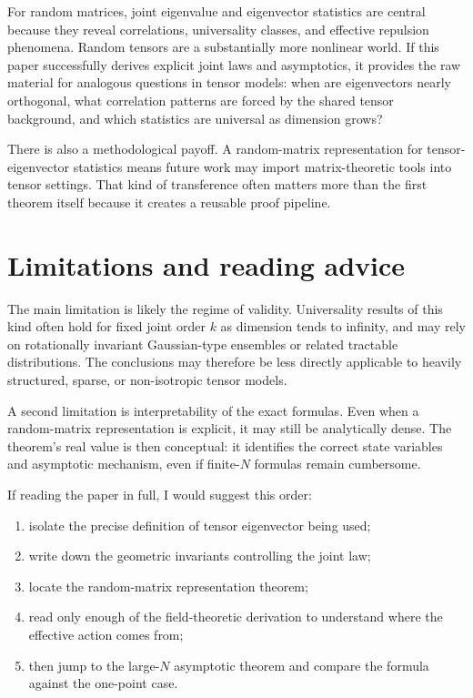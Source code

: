 \documentclass[11pt]{article}
\begin{document}
For random matrices, joint eigenvalue and eigenvector statistics are central because they reveal correlations, universality classes, and effective repulsion phenomena. Random tensors are a substantially more nonlinear world. If this paper successfully derives explicit joint laws and asymptotics, it provides the raw material for analogous questions in tensor models: when are eigenvectors nearly orthogonal, what correlation patterns are forced by the shared tensor background, and which statistics are universal as dimension grows?

There is also a methodological payoff. A random-matrix representation for tensor-eigenvector statistics means future work may import matrix-theoretic tools into tensor settings. That kind of transference often matters more than the first theorem itself because it creates a reusable proof pipeline.

\section*{Limitations and reading advice}
The main limitation is likely the regime of validity. Universality results of this kind often hold for fixed joint order $k$ as dimension tends to infinity, and may rely on rotationally invariant Gaussian-type ensembles or related tractable distributions. The conclusions may therefore be less directly applicable to heavily structured, sparse, or non-isotropic tensor models.

A second limitation is interpretability of the exact formulas. Even when a random-matrix representation is explicit, it may still be analytically dense. The theorem's real value is then conceptual: it identifies the correct state variables and asymptotic mechanism, even if finite-$N$ formulas remain cumbersome.

If reading the paper in full, I would suggest this order:
\begin{enumerate}[leftmargin=1.5em]
\item isolate the precise definition of tensor eigenvector being used;
\item write down the geometric invariants controlling the joint law;
\item locate the random-matrix representation theorem;
\item read only enough of the field-theoretic derivation to understand where the effective action comes from;
\item then jump to the large-$N$ asymptotic theorem and compare the formula against the one-point case.
\end{enumerate}
\end{document}
